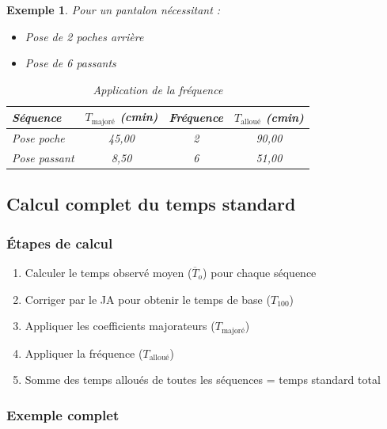 \documentclass[a4paper,12pt]{article}
\newtheorem{exemple}{Exemple}[section]
\begin{document}
\begin{exemple}
Pour un pantalon nécessitant :

\begin{itemize}
    \item Pose de 2 poches arrière
    \item Pose de 6 passants
\end{itemize}

\begin{table}[ht]
\centering
\begin{tabular}{|l|c|c|c|}
\hline
\textbf{Séquence} & $T_{\text{majoré}}$ (cmin) & \textbf{Fréquence} & $T_{\text{alloué}}$ (cmin) \\
\hline
Pose poche & 45,00 & 2 & 90,00 \\
Pose passant & 8,50 & 6 & 51,00 \\
\hline
\end{tabular}
\caption{Application de la fréquence}
\end{table}
\end{exemple}

\subsection{Calcul complet du temps standard}

\subsubsection{Étapes de calcul}

\begin{enumerate}
    \item Calculer le temps observé moyen ($\overline{T}_o$) pour chaque séquence
    \item Corriger par le JA pour obtenir le temps de base ($T_{100}$)
    \item Appliquer les coefficients majorateurs ($T_{\text{majoré}}$)
    \item Appliquer la fréquence ($T_{\text{alloué}}$)
    \item Somme des temps alloués de toutes les séquences = temps standard total
\end{enumerate}

\subsubsection{Exemple complet}
\end{document}
